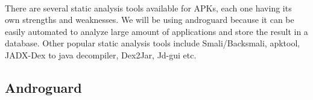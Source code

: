 \documentclass[../main.tex]{subfile}
\begin{document}
	
		\paragraph{} There are several static analysis tools available for APKs, each one having its own strengths and weaknesses. We will be using androguard because it can be easily automated to analyze large amount of applications and store the result in a database. Other popular static analysis tools include Smali/Backsmali, apktool, JADX-Dex to java decompiler, Dex2Jar, Jd-gui etc.
		
		\subsection{Androguard}\label{sec:androguard}
\end{document}
